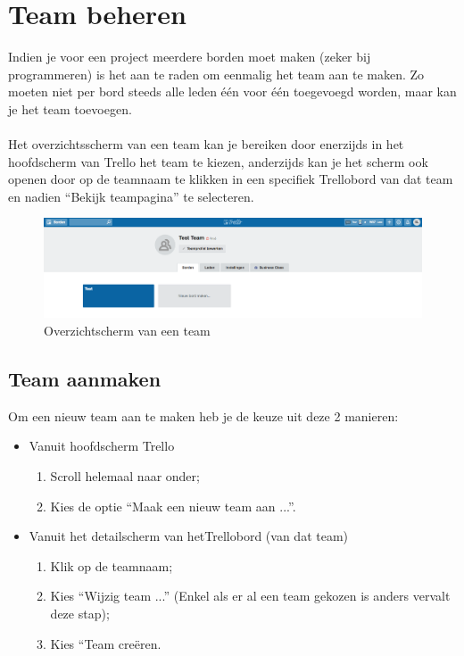 \chapter{Team beheren}\label{chapter:team_beheren}

Indien je voor een project meerdere borden moet maken (zeker bij programmeren) is het aan te raden om eenmalig het team aan te maken. Zo moeten niet per bord steeds alle leden \'e\'en voor \'e\'en toegevoegd worden, maar kan je het team toevoegen.
\\\\
Het overzichtsscherm van een team  kan je bereiken door enerzijds in het hoofdscherm van Trello het team te kiezen, anderzijds kan je het scherm ook openen door op de teamnaam te klikken in een specifiek Trellobord van dat team en nadien ``Bekijk teampagina'' te selecteren.
\\
\begin{figure}[H]
	\centering
	\includegraphics[width=\textwidth]{./afbeeldingen/overzicht_team.png}
	\caption{Overzichtscherm van een team}
	\label{fig:overzicht_team}	
\end{figure} 

\section{Team aanmaken}

Om een nieuw team aan te maken heb je de keuze uit deze 2 manieren:
\begin{itemize}
	\item Vanuit hoofdscherm Trello
	\begin{enumerate}[nolistsep]
		\item Scroll helemaal naar onder;
		\item Kies de optie ``Maak een nieuw team aan ...''.
	\end{enumerate}
\pagebreak
	\item Vanuit het detailscherm van hetTrellobord (van dat team)
	\begin{enumerate}[nolistsep]
		\item Klik op de teamnaam;
		\item Kies ``Wijzig team ...'' (Enkel als er al een team gekozen is anders vervalt deze stap);
		\item Kies ``Team cre\"eren.
	\end{enumerate}
\end{itemize}

